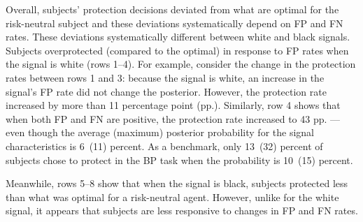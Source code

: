 \documentclass[12pt,a4paper]{article}
\begin{document}
Overall, subjects' protection decisions deviated from what are optimal for the risk-neutral subject and these deviations systematically depend on FP and FN rates. These deviations systematically different between white and black signals. Subjects overprotected (compared to the optimal) in response to FP rates when the signal is white (rows 1--4). For example, consider the change in the protection rates between rows 1 and 3: because the signal is white, an increase in the signal's FP rate did not change the posterior. However, the protection rate increased by more than 11 percentage point (pp.). Similarly, row 4 shows that when both FP and FN are positive, the protection rate increased to 43 pp. --- even though the average (maximum) posterior probability for the signal characteristics is 6~(11) percent. As a benchmark, only 13~(32) percent of subjects chose to protect in the BP task when the probability is 10~(15) percent. 

Meanwhile, rows 5--8 show that when the signal is black, subjects protected less than what was optimal for a risk-neutral agent. However, unlike for the white signal, it appears that subjects are less responsive to changes in FP and FN rates.

\end{document}
